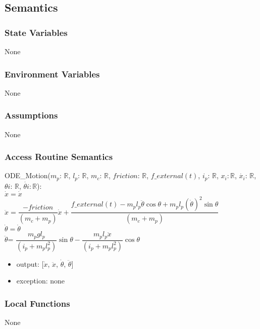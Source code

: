 \documentclass[12pt, titlepage]{article}
\begin{document}
\subsection{Semantics}

\subsubsection{State Variables}
None
\subsubsection{Environment Variables}
None
\subsubsection{Assumptions}
None
\subsubsection{Access Routine Semantics}




\noindent ODE\_Motion($ m_p$: $\mathbb{R}$, $l_p$: $\mathbb{R}$, $m_c$: $\mathbb{R}$, $friction$: $\mathbb{R}$, $f\_external(t)$, $i_p$: $\mathbb{R}$, $x_i$$: \mathbb{R}$, $\dot{x_i}$: $\mathbb{R}$, $\theta{i}$: $\mathbb{R}$, $\dot{\theta{i}}$$: \mathbb{R}$):
\\

\noindent$\dot{x} = \dot{x} $\\
$\ddot{x} =\dfrac{- friction } {(m_c+m_p)}\dot{x}+ \dfrac{ f\_external(t)- m_pl_p\ddot{\theta}\cos{\theta}+ m_pl_p(\dot{\theta}) ^ 2 \sin{\theta}} {(m_c+m_p)}$\\

\noindent$\dot{\theta} = \dot{\theta}$\\
$\ddot{\theta}$= $\dfrac{m_pgl_p}{(i_p+m_pl_p^2)}\sin{\theta}-\dfrac{m_pl_p\ddot{x}}{(i_p+m_pl_p^2)}\cos{\theta}$\
\begin{itemize}
\item output:
[$\dot{x}$, $\ddot{x}$, $\dot{\theta}$, $\ddot{\theta}$]

\item exception: none
\end{itemize}

\subsubsection{Local Functions}
None
\end{document}
